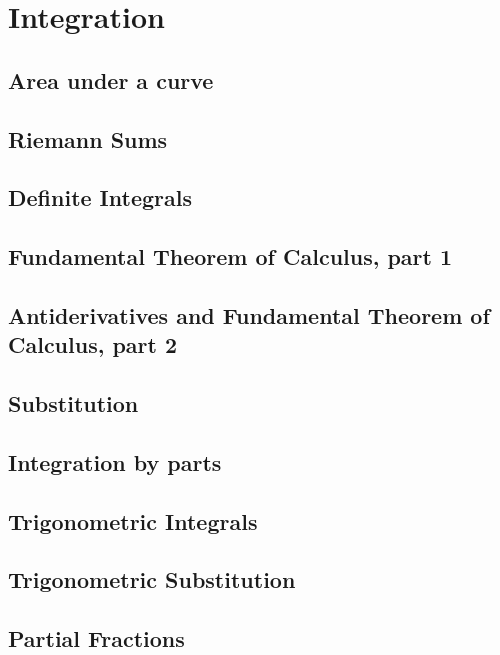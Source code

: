 \documentclass[symmetric,justified,marginals=justified,notoc]{tufte-book}
\theoremstyle{mytheoremstyle}
\begin{document}
\chapter{Integration}

	\section{Area under a curve}
	\lipsum[31-50]
	
	\section{Riemann Sums}
	\lipsum[31-50]
	
	\section{Definite Integrals}
	\lipsum[31-50]
	
	\section{Fundamental Theorem of Calculus, part 1}
	\lipsum[31-50]
	
	\section{Antiderivatives and Fundamental Theorem of Calculus, part 2}
	\lipsum[31-50]
	
	\section{Substitution}
	\lipsum[31-50]
	
	\section{Integration by parts}
	\lipsum[31-50]
	
	\section{Trigonometric Integrals}
	\lipsum[31-50]
	
	\section{Trigonometric Substitution}
	\lipsum[31-50]
	
	\section{Partial Fractions}
	\lipsum[31-50]
\end{document}
